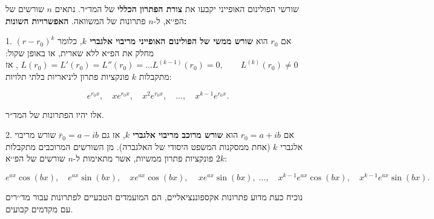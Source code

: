 \documentclass{article}
\numberwithin{equation}{section}
\begin{document}
שורשי הפולינום האופייני יקבעו את \textbf{צורת הפתרון הכללי} של המד״ר.
נתאים $n$ שורשים של הפ׳׳א, ל-$n$ פתרונות של המשוואה.
\textbf{האפשרויות השונות:}

1. אם $r_0$ הוא \textbf{שורש ממשי של הפולינום האופייני מריבוי אלגברי $k$}, כלומר $(r - r_0)^k$ מחלק את הפ״א ללא שארית, או באופן שקול: $L(r_{0})=L'(r_{0})=L''(r_{0})=\dots L^{(k-1)}(r_{0})=0,\qquad L^{(k)}(r_{0})\neq 0$
,
אז מתקבלות $k$ פונקציות פתרון ליניאריות בלתי תלויות:

\[
e^{r_0 x}, \quad x e^{r_0 x}, \quad x^2 e^{r_0 x}, \quad \dots, \quad x^{k-1} e^{r_0 x}.
\]

אלו יהיו הפתרונות של המד״ר.

2. אם $r_0 = a + ib$ הוא \textbf{שורש מרוכב מריבוי אלגברי $k$}, אז גם $ \bar{r}_0 = a - ib$ שורש מריבוי אלגברי $k$ (אחת ממסקנות המשפט היסודי של האלגברה).
מן השורשים המרוכבים מתקבלות $2k$ פונקציות פתרון ממשיות, אשר מתאימות ל-$n$ שורשים של הפ׳׳א:

\[
e^{ax}\cos(bx), \quad e^{ax}\sin(bx), \quad x e^{ax}\cos(bx), \quad\, x e^{ax}\sin(bx),\; \dots, \quad x^{k-1} e^{ax}\cos(bx), \quad x^{k-1} e^{ax}\sin(bx).
\]

נוכיח כעת מדוע פתרונות אקספוננציאליים, הם המועמדים הטבעיים לפתרונות עבור מד׳׳רים עם מקדמים קבועים.
\end{document}
